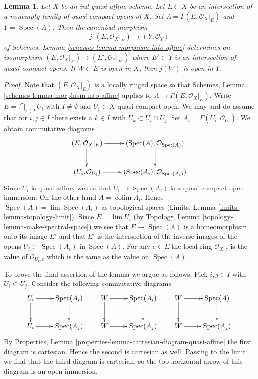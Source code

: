 \documentclass{stacks-project}
\theoremstyle{plain}
\newtheorem{lemma}[subsection]{Lemma}
\theoremstyle{definition}
\theoremstyle{remark}
\numberwithin{equation}{subsection}
\def\lim{\mathop{\mathrm{lim}}\nolimits}
\def\colim{\mathop{\mathrm{colim}}\nolimits}
\def\Spec{\mathop{\mathrm{Spec}}}
\begin{document}
\begin{lemma}
\label{lemma-sits-in-functions}
Let $X$ be an ind-quasi-affine scheme. Let $E \subset X$ be an
intersection of a nonempty family of quasi-compact opens of $X$.
Set $A = \Gamma(E, \mathcal{O}_X|_E)$ and $Y = \Spec(A)$.
Then the canonical morphism
$$
j : (E, \mathcal{O}_X|_E) \longrightarrow (Y, \mathcal{O}_Y)
$$
of Schemes, Lemma \ref{schemes-lemma-morphism-into-affine}
determines an isomorphism
$(E, \mathcal{O}_X|_E) \to (E', \mathcal{O}_Y|_{E'})$
where $E' \subset Y$ is an intersection of quasi-compact opens.
If $W \subset E$ is open in $X$, then $j(W)$ is open in $Y$.
\end{lemma}

\begin{proof}
Note that $(E, \mathcal{O}_X|_E)$ is a locally ringed space so that
Schemes, Lemma \ref{schemes-lemma-morphism-into-affine} applies
to $A \to \Gamma(E, \mathcal{O}_X|_E)$. Write $E = \bigcap_{i \in I} U_i$
with $I \not = \emptyset$ and $U_i \subset X$ quasi-compact open.
We may and do assume that for $i, j \in I$ there exists a $k \in I$ with
$U_k \subset U_i \cap U_j$. Set $A_i = \Gamma(U_i, \mathcal{O}_{U_i})$.
We obtain commutative diagrams
$$
\xymatrix{
(E, \mathcal{O}_X|_E) \ar[r] \ar[d] &
(\Spec(A), \mathcal{O}_{\Spec(A)}) \ar[d] \\
(U_i, \mathcal{O}_{U_i}) \ar[r] &
(\Spec(A_i), \mathcal{O}_{\Spec(A_i)})
}
$$
Since $U_i$ is quasi-affine, we see that $U_i \to \Spec(A_i)$
is a quasi-compact open immersion. On the other hand
$A = \colim A_i$. Hence $\Spec(A) = \lim \Spec(A_i)$ as topological
spaces (Limits, Lemma \ref{limits-lemma-topology-limit}). Since
$E = \lim U_i$ (by Topology, Lemma \ref{topology-lemma-make-spectral-space})
we see that $E \to \Spec(A)$ is a homeomorphism onto its
image $E'$ and that $E'$ is the intersection of the inverse images
of the opens $U_i \subset \Spec(A_i)$ in $\Spec(A)$. For any
$e \in E$ the local ring $\mathcal{O}_{X, e}$ is the value
of $\mathcal{O}_{U_i, e}$ which is the same as the value on $\Spec(A)$.

\medskip\noindent
To prove the final assertion of the lemma we argue as follows.
Pick $i, j \in I$ with $U_i \subset U_j$.
Consider the following commutative diagrams
$$
\xymatrix{
U_i \ar[r] \ar[d] & \Spec(A_i) \ar[d] \\
U_i \ar[r] & \Spec(A_j)
}
\quad\quad
\xymatrix{
W \ar[r] \ar[d] & \Spec(A_i) \ar[d] \\
W \ar[r] & \Spec(A_j)
}
\quad\quad
\xymatrix{
W \ar[r] \ar[d] & \Spec(A) \ar[d] \\
W \ar[r] & \Spec(A_j)
}
$$
By Properties, Lemma
\ref{properties-lemma-cartesian-diagram-quasi-affine}
the first diagram is cartesian. Hence the second is cartesian as well.
Passing to the limit we find that the third diagram
is cartesian, so the top horizontal arrow of this diagram is an open immersion.
\end{proof}
\end{document}
